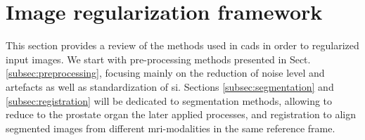 \section{Image regularization framework} \label{sec:imaprocfra}

This section provides a review of the methods used in \acp{cad} in order to regularized input images. We start with pre-processing methods presented in Sect. \ref{subsec:preprocessing}, focusing mainly on the reduction of noise level and artefacts as well as standardization of \ac{si}. Sections \ref{subsec:segmentation} and \ref{subsec:registration} will be dedicated to segmentation methods, allowing to reduce to the prostate organ the later applied processes, and registration to align segmented images from different \ac{mri}-modalities in the same reference frame.






